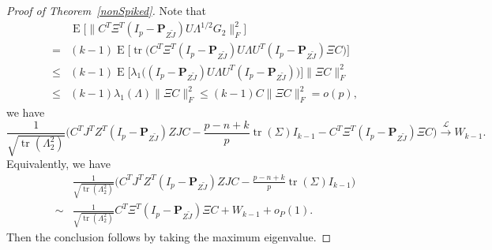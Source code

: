 \documentclass[12pt]{article} %
\DeclareMathOperator{\mytr}{tr}
\DeclareMathOperator{\myE}{E}
\newcommand{\bP}{\mathbf{P}}
\theoremstyle{definition}
\begin{document}
\begin{proof}[\textrm{Proof of Theorem~\ref{nonSpiked}}]
    Note that
    $$
    \begin{aligned}
        &\myE\big[\| C^T \Xi^T (I_p-\bP_{Z\tilde{J}})U\Lambda^{1/2}G_2\|_F^2\big]\\
        = &
        (k-1)\myE \big[\mytr\big(
        C^T \Xi^T (I_p-\bP_{Z\tilde{J}})U\Lambda U^T (I_p-\bP_{Z\tilde{J}})\Xi C
        \big)\big]\\
        \leq &
        (k-1)\myE \big[\lambda_1\big(
         (I_p-\bP_{Z\tilde{J}})U\Lambda U^T (I_p-\bP_{Z\tilde{J}})
        \big)\big]
        \|\Xi C\|_F^2\\
        \leq &
        (k-1)\lambda_1(\Lambda)\|\Xi C\|_F^2
        \leq 
        (k-1)C\|\Xi C\|_F^2=o(p),
    \end{aligned}
    $$
    we have
    $$
    \frac{1}{\sqrt{\mytr(\Lambda_2^2)}}
    {\Big(C^TJ^T Z^T(I_p-\bP_{Z\tilde J}) ZJC- \frac{p-n+k}{p}\mytr(\Sigma)I_{k-1}-C^T \Xi^T (I_p-\bP_{Z\tilde{J}})\Xi C}\Big)
    \xrightarrow{\mathcal{L}}W_{k-1}.
    $$
    Equivalently, we have
    $$
    \begin{aligned}
        &
    \frac{1}{\sqrt{\mytr(\Lambda_2^2)}}
        {\Big(C^TJ^T Z^T(I_p-\bP_{Z\tilde J}) ZJC- \frac{p-n+k}{p}\mytr(\Sigma)I_{k-1}}\Big)\\
        \sim&
    \frac{1}{\sqrt{\mytr(\Lambda_2^2)}}
         C^T \Xi^T (I_p-\bP_{Z\tilde{J}})\Xi C
        +W_{k-1}+o_P(1).
    \end{aligned}
    $$
    Then the conclusion follows by taking the maximum eigenvalue.
\end{proof}
\end{document}
